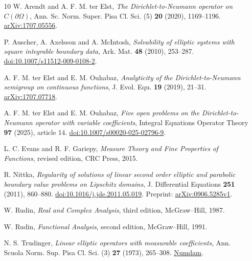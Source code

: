 \documentclass[11pt]{article}
\begin{document}
\begin{thebibliography}{10}
W. Arendt and A. F. M. ter Elst,
\emph{The Dirichlet-to-Neumann operator on $C(\partial\Omega)$},
Ann. Sc. Norm. Super. Pisa Cl. Sci. (5) \textbf{20} (2020), 1169--1196.
\href{https://arxiv.org/abs/1707.05556}{arXiv:1707.05556}.

P. Auscher, A. Axelsson and A. McIntosh,
\emph{Solvability of elliptic systems with square integrable boundary data},
Ark. Mat. \textbf{48} (2010), 253--287.
\href{https://doi.org/10.1007/s11512-009-0108-2}{doi:10.1007/s11512-009-0108-2}.

A. F. M. ter Elst and E. M. Ouhabaz,
\emph{Analyticity of the Dirichlet-to-Neumann semigroup on continuous functions},
J. Evol. Equ. \textbf{19} (2019), 21--31.
\href{https://arxiv.org/abs/1707.07718}{arXiv:1707.07718}.

A. F. M. ter Elst and E. M. Ouhabaz,
\emph{Five open problems on the Dirichlet-to-Neumann operator with variable
coefficients}, Integral Equations Operator Theory \textbf{97} (2025), article 14.
\href{https://doi.org/10.1007/s00020-025-02796-9}{doi:10.1007/s00020-025-02796-9}.

L. C. Evans and R. F. Gariepy,
\emph{Measure Theory and Fine Properties of Functions}, revised edition,
CRC Press, 2015.

R. Nittka,
\emph{Regularity of solutions of linear second order elliptic and parabolic
boundary value problems on Lipschitz domains},
J. Differential Equations \textbf{251} (2011), 860--880.
\href{https://doi.org/10.1016/j.jde.2011.05.019}{doi:10.1016/j.jde.2011.05.019}.
Preprint: \href{https://arxiv.org/abs/0906.5285v1}{arXiv:0906.5285v1}.

W. Rudin, \emph{Real and Complex Analysis}, third edition,
McGraw--Hill, 1987.

W. Rudin, \emph{Functional Analysis}, second edition,
McGraw--Hill, 1991.

N. S. Trudinger,
\emph{Linear elliptic operators with measurable coefficients},
Ann. Scuola Norm. Sup. Pisa Cl. Sci. (3) \textbf{27} (1973), 265--308.
\href{https://www.numdam.org/item/ASNSP_1973_3_27_2_265_0/}{Numdam}.
\end{thebibliography}
\end{document}
